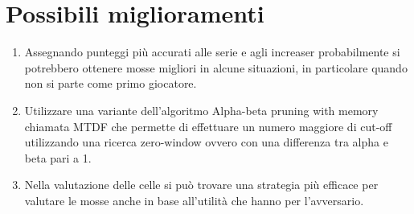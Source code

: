 \section{Possibili miglioramenti}
\begin{enumerate}
    \item Assegnando punteggi più accurati alle serie e agli increaser probabilmente si potrebbero ottenere mosse migliori in alcune situazioni, in particolare quando non si parte come primo giocatore.
    \item Utilizzare una variante dell'algoritmo Alpha-beta pruning with memory chiamata MTDF che permette di effettuare un numero maggiore di cut-off utilizzando una ricerca zero-window ovvero con una differenza tra alpha e beta pari a 1.
    \item Nella valutazione delle celle si può trovare una strategia più efficace per valutare le mosse anche in base all'utilità che hanno per l'avversario.
\end{enumerate}
